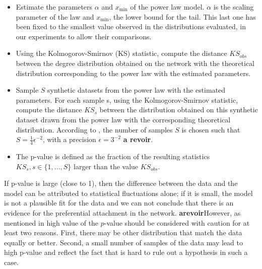 \begin{itemize}
	\item Estimate the parameters $\alpha$ and $x_\text{min}$ of the power law model. $\alpha$ is the scaling parameter of the law and $x_\text{min}$, the lower bound for the tail. This last one has been fixed to the smallest value observed in the distributions evaluated, in our experiments to allow their comparisons.
	\item  Using the Kolmogorov-Smirnov (KS) statistic, compute the distance $KS_{obs}$  between the degree distribution obtained on the network with the theoretical distribution corresponding to the power law with the estimated parameters.
	\item Sample $S$ synthetic datasets from the power law with the estimated parameters. For each sample s, using the Kolmogorov-Smirnov statistic, compute the distance $KS_{s}$ between the distribution obtained on this synthetic dataset drawn from the power law with the corresponding theoretical distribution. According to  \cite{clauset2009power}, the number of samples $S$ is chosen such that $S = \frac{1}{4}\epsilon^{-2}$, with a precision  $\epsilon = 3^{-2}$ \textbf{a revoir}. 
    \item  The p-value is defined as the fraction of  the resulting statistics $KS_s, s \in \{1,...,S\}$  larger than the value $KS_{obs}$.  
\end{itemize}

 If  p-value is large (close to 1), then the difference between the data and the model can be attributed to statistical fluctuations alone; if it is small, the model is not a plausible fit for the data and we can not conclude that there is an evidence for the preferential attachment in the network. 
\textbf{arevoir}However, as mentioned in \cite{clauset2009power} high value of the $p$-value should be considered with caution for at least two reasons. First, there may be other distribution that match the data equally or better. Second, a small number of samples of the data may lead to high p-value and reflect the fact that is hard to rule out a hypothesis in such a case.


